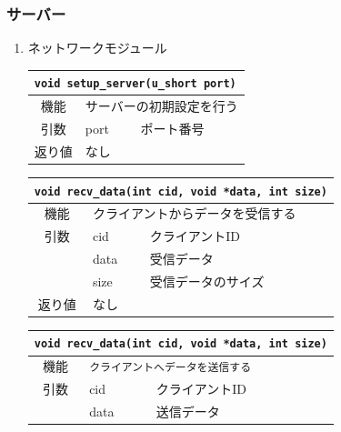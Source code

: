 \documentclass{jarticle}
\begin{document}
\subsubsection{サーバー}
\begin{enumerate}
  \item ネットワークモジュール
    \begin{table}[H]
      \begin{center}
        \begin{tabular}{|c|p{3em}p{30em}|} \hline
          \multicolumn{3}{|l|}{{\tt void setup\_server(u\_short port)}}\\ \hline \hline
          機能 & \multicolumn{2}{|l|}{サーバーの初期設定を行う}\\
          引数 & port & ポート番号\\
          返り値 & なし & \\ \hline
        \end{tabular}
      \end{center}
    \end{table}
%
    \begin{table}[H]
      \begin{center}
        \begin{tabular}{|c|p{3em}p{30em}|} \hline
          \multicolumn{3}{|l|}{{\tt void recv\_data(int cid, void *data, int size)}}\\ \hline \hline
          機能 & \multicolumn{2}{|l|}{クライアントからデータを受信する}\\
          引数 & cid & クライアントID\\
          & data & 受信データ\\
          & size & 受信データのサイズ\\
          返り値 & なし & \\ \hline
        \end{tabular}
      \end{center}
    \end{table}
%
    \begin{table}[H]
      \begin{center}
        \begin{tabular}{|c|p{3em}p{30em}|} \hline
          \multicolumn{3}{|l|}{{\tt void recv\_data(int cid, void *data, int size)}}\\ \hline \hline
          機能 & \multicolumn{2}{|l|}{{\tt クライアントへデータを送信する}}\\
          引数 & cid & クライアントID\\
          & data & 送信データ\\

\end{tabular}
\end{center}
\end{table}
\end{enumerate}
\end{document}
